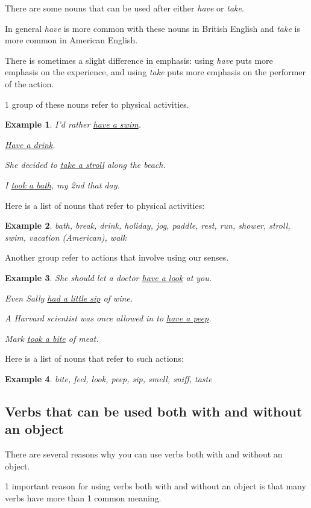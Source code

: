 \documentclass[oneside]{book}
\numberwithin{equation}{section}
\newtheorem{example}{Example}[section]
\begin{document}
%
\noindent{} There are some nouns that can be used after either \textit{have} or \textit{take}.

In general \textit{have} is more common with these nouns in British English and \textit{take} is more common in American English.

There is sometimes a slight difference in emphasis: using \textit{have} puts more emphasis on the experience, and using \textit{take} puts more emphasis on the performer of the action.

%
1 group of these nouns refer to physical activities.
\begin{example}
    I'd rather \underline{have a swim}.
    
    \underline{Have a drink}.
    
    She decided to \underline{take a stroll} along the beach.
    
    I \underline{took a bath}, my 2nd that day.
\end{example}
Here is a list of nouns that refer to physical activities:
\begin{example}
    bath, break, drink, holiday, jog, paddle, rest, run, shower, stroll, swim, vacation (\emph{American}), walk
\end{example}
Another group refer to actions that involve using our senses.
\begin{example}
    She should let a doctor \underline{have a look} at you.
    
    Even Sally \underline{had a little sip} of wine.
    
    A Harvard scientist was once allowed in to \underline{have a peep}.
    
    Mark \underline{took a bite} of meat.
\end{example}
Here is a list of nouns that refer to such actions:
\begin{example}
    bite, feel, look, peep, sip, smell, sniff, taste
\end{example}

\subsection{Verbs that can be used both with and without an object}
\noindent{} There are several reasons why you can use verbs both with and without an object.

%
\noindent{} 1 important reason for using verbs both with and without an object is that many verbs have more than 1 common meaning.
\end{document}
